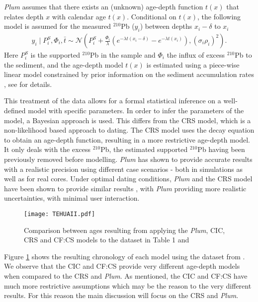 \documentclass [10pt] {article}
\begin{document}
\textit{Plum} assumes that there exists an (unknown) age-depth function $t(x)$ that relates depth $x$ with calendar age $t(x)$. 
Conditional on $t(x)$, the following model is assumed for the measured $^{210}$Pb ($y_i$) between depths $x_i - \delta$ to $x_i$
\begin{eqnarray}
y_i\mid P^S_i, \Phi_i, \bar{t}\sim \mathcal{N} \left(P^S_i+\frac{\Phi_i}{\lambda} \left( e^{-\lambda t(x_i-\delta)} - e^{-\lambda t(x_i)} \right), (\sigma_i\rho_i)^2 \right). 
\end{eqnarray}
Here $P_i^S$ is the supported $^{210}$Pb in the sample and $\Phi_i$ the influx of excess $^{210}$Pb to the sediment, and the age-depth model $t(x)$ is estimated using a piece-wise linear model constrained by prior information on the sediment accumulation rates  \citep{Blaauw2011}, see \citep{Aquino2018} for details.

This treatment of the data allows for a formal statistical inference on a well-defined model with specific parameters. 
In order to infer the parameters of the model, a Bayesian approach is used.
This differs from the CRS model, which is a non-likelihood based approach to dating.
The CRS model uses the decay equation to obtain an age-depth function, resulting in a more restrictive age-depth model. 
It only deals with the excess $^{210}$Pb, the estimated supported $^{210}$Pb having been previously removed before modelling.
\textit{Plum} has shown to provide accurate results with a realistic precision using different case scenarios \citep{Aquino2018,Aquino2020} - both in simulations as well as for real cores.
Under optimal dating conditions, \textit{Plum} and the CRS model have been shown to provide similar results \citep{Aquino2020}, with \textit{Plum} providing more realistic uncertainties, with minimal user interaction.

\begin{figure}[h!]
 \centering
	\texttt{[image: TEHUAII.pdf]}
	\caption{Comparison between ages resulting from applying the \textit{Plum}, CIC, CRS and CF:CS models to the dataset in Table 1 and \citet{Sanchez-Cabeza2012}} 
  \label{fig:tehuaii}
\end{figure}

Figure \ref{fig:tehuaii} shows the resulting chronology of each model using the dataset from \citet{Sanchez-Cabeza2012}. 
We observe that the CIC and CF:CS provide very different age-depth models when compared to the CRS and \textit{Plum}. 
As mentioned, the CIC and CF:CS have much more restrictive assumptions which may be the reason to the very different results.
For this reason the main discussion will focus on the CRS and \textit{Plum}.
\end{document}
